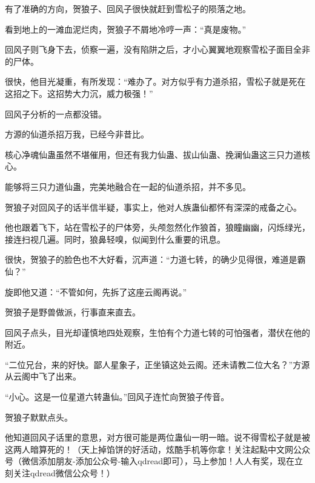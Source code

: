 \begin{this_body}
有了准确的方向，贺狼子、回风子很快就赶到雪松子的陨落之地。

看到地上的一滩血泥烂肉，贺狼子不屑地冷哼一声：“真是废物。”

回风子则飞身下去，侦察一遍，没有陷阱之后，才小心翼翼地观察雪松子面目全非的尸体。

很快，他目光凝重，有所发现：“难办了。对方似乎有力道杀招，雪松子就是死在这招之下。这招势大力沉，威力极强！”

回风子分析的一点都没错。

方源的仙道杀招万我，已经今非昔比。

核心净魂仙蛊虽然不堪催用，但还有我力仙蛊、拔山仙蛊、挽澜仙蛊这三只力道核心。

能够将三只力道仙蛊，完美地融合在一起的仙道杀招，并不多见。

贺狼子对回风子的话半信半疑，事实上，他对人族蛊仙都怀有深深的戒备之心。

他也跟着飞下，站在雪松子的尸体旁，头颅忽然化作狼首，狼瞳幽幽，闪烁绿光，接连扫视几遍。同时，狼鼻轻嗅，似闻到什么重要的讯息。

很快，贺狼子的脸色也不大好看，沉声道：“力道七转，的确少见得很，难道是霸仙？”

旋即他又道：“不管如何，先拆了这座云阁再说。”

贺狼子是野兽做派，行事直来直去。

回风子点头，目光却谨慎地四处观察，生怕有个力道七转的可怕强者，潜伏在他的附近。

“二位兄台，来的好快。鄙人星象子，正坐镇这处云阁。还未请教二位大名？”方源从云阁中飞了出来。

“小心。这是一位星道六转蛊仙。”回风子连忙向贺狼子传音。

贺狼子默默点头。

他知道回风子话里的意思，对方很可能是两位蛊仙一明一暗。说不得雪松子就是被这两人暗算死的！（天上掉馅饼的好活动，炫酷手机等你拿！关注起點中文网公众号（微信添加朋友-添加公众号-输入qdread即可），马上参加！人人有奖，现在立刻关注qdread微信公众号！）

\end{this_body}

